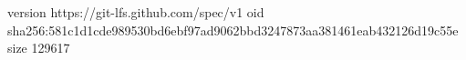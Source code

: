 version https://git-lfs.github.com/spec/v1
oid sha256:581c1d1cde989530bd6ebf97ad9062bbd3247873aa381461eab432126d19c55e
size 129617
